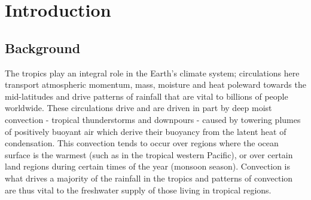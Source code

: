\documentclass[letterpaper,12pt,titlepage,oneside,final]{book}
\begin{document}
 

\chapter{Introduction}
\section{Background}

The tropics play an integral role in the Earth's climate system; circulations here transport atmospheric momentum, mass, moisture and heat poleward towards the mid-latitudes and drive patterns of rainfall that are vital to billions of people worldwide. These circulations drive and are driven in part by deep moist convection - tropical thunderstorms and downpours - caused by towering plumes of positively buoyant air which derive their buoyancy from the latent heat of condensation. This convection tends to occur over regions where the ocean surface is the warmest (such as in the tropical western Pacific), or over certain land regions during certain times of the year (monsoon season). Convection is what drives a majority of the rainfall in the tropics and patterns of convection are thus vital to the freshwater supply of those living in tropical regions.
\end{document}
